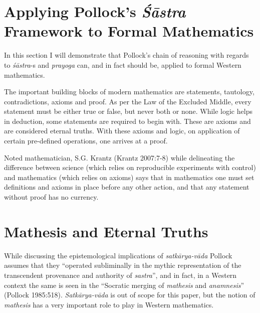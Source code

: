 \section*{Applying Pollock’s {\sl\bfseries Śāstra} Framework to Formal Mathematics}

In this section I will demonstrate that Pollock’s chain of reasoning with regards to {\sl śāstra}-s and {\sl prayoga} can, and in fact should be, applied to formal Western mathematics.

The important building blocks of modern mathematics are statements, tautology, contradictions, axioms and proof. As per the Law of the Excluded Middle, every statement must be either true or false, but never both or none.  While logic helps in deduction, some statements are required to begin with. These are axioms and are considered eternal truths. With these axioms and logic, on application of certain pre-defined operations, one arrives at a proof. 

Noted mathematician, S.G. Krantz (Krantz 2007:7-8) while delineating the difference between science (which relies on reproducible experiments with control) and mathematics (which relies on axioms) says that in mathematics one must set definitions and axioms in place before any other action, and that any statement without proof has no currency.	

\section*{Mathesis and Eternal Truths}

While discussing the epistemological implications of {\sl satkārya-vāda} Pollock assumes that they ``operated subliminally in the mythic representation of the transcendent provenance and authority of {\sl sastra}'', and in fact, in a Western context the same is seen in the ``Socratic merging of {\sl mathesis} and {\sl anamnesis}'' (Pollock 1985:518). {\sl Satkārya-vāda} is out of scope for this paper, but the notion of {\sl mathesis} has a very important role to play in Western mathematics. 

